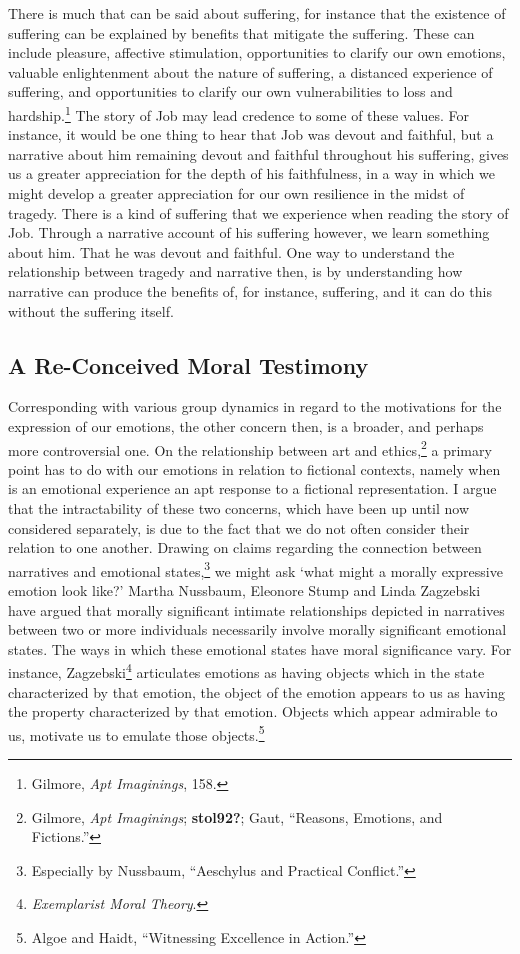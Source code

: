 \documentclass[phdthesis,12pt,final]{wuthesis}
\theoremstyle{definition}
\theoremstyle{definition}
\theoremstyle{definition}
\theoremstyle{definition}
\theoremstyle{remark}
\begin{document}
There is much that can be said about suffering, for instance that the existence of suffering can be explained by benefits that mitigate the suffering. These can include pleasure, affective stimulation, opportunities to clarify our own emotions, valuable enlightenment about the nature of suffering, a distanced experience of suffering, and opportunities to clarify our own vulnerabilities to loss and hardship.\footnote{Gilmore, \emph{Apt {Imaginings}}, 158.} The story of Job may lead credence to some of these values. For instance, it would be one thing to hear that Job was devout and faithful, but a narrative about him remaining devout and faithful throughout his suffering, gives us a greater appreciation for the depth of his faithfulness, in a way in which we might develop a greater appreciation for our own resilience in the midst of tragedy. There is a kind of suffering that we experience when reading the story of Job. Through a narrative account of his suffering however, we learn something about him. That he was devout and faithful. One way to understand the relationship between tragedy and narrative then, is by understanding how narrative can produce the benefits of, for instance, suffering, and it can do this without the suffering itself.

\subsection*{A Re-Conceived Moral Testimony}\label{a-re-conceived-moral-testimony}

Corresponding with various group dynamics in regard to the motivations for the expression of our emotions, the other concern then, is a broader, and perhaps more controversial one. On the relationship between art and ethics,\footnote{Gilmore, \emph{Apt {Imaginings}}; \textbf{stol92?}; Gaut, {``Reasons, Emotions, and Fictions.''}} a primary point has to do with our emotions in relation to fictional contexts, namely when is an emotional experience an apt response to a fictional representation. I argue that the intractability of these two concerns, which have been up until now considered separately, is due to the fact that we do not often consider their relation to one another. Drawing on claims regarding the connection between narratives and emotional states,\footnote{Especially by Nussbaum, {``Aeschylus and Practical Conflict.''}} we might ask `what might a morally expressive emotion look like?' Martha Nussbaum, Eleonore Stump and Linda Zagzebski have argued that morally significant intimate relationships depicted in narratives between two or more individuals necessarily involve morally significant emotional states. The ways in which these emotional states have moral significance vary. For instance, Zagzebski\footnote{\emph{Exemplarist {Moral Theory}}.} articulates emotions as having objects which in the state characterized by that emotion, the object of the emotion appears to us as having the property characterized by that emotion. Objects which appear admirable to us, motivate us to emulate those objects.\footnote{Algoe and Haidt, {``Witnessing Excellence in Action.''}}
\end{document}
